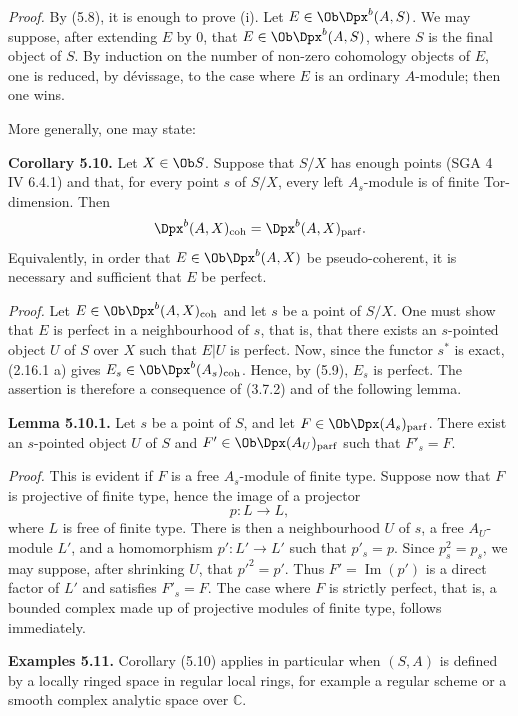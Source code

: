 \emph{Proof.} By (5.8), it is enough to prove (i). Let \(E\in\Ob\Dpx^b(A,S)\). We may suppose, after extending \(E\) by \(0\), that \(E\in\Ob\Dpx^b(A,S)\), where \(S\) is the final object of \(S\). By induction on the number of non-zero cohomology objects of \(E\), one is reduced, by dévissage, to the case where \(E\) is an ordinary \(A\)-module; then one wins.

More generally, one may state:

\textbf{Corollary 5.10.} Let \(X\in\Ob S\). Suppose that \(S/X\) has enough points (SGA 4 IV 6.4.1) and that, for every point \(s\) of \(S/X\), every left \(A_s\)-module is of finite Tor-dimension. Then
\[
  \Dpx^b(A,X)_{\mathrm{coh}}=\Dpx^b(A,X)_{\mathrm{parf}}.
\]
Equivalently, in order that \(E\in\Ob\Dpx^b(A,X)\) be pseudo-coherent, it is necessary and sufficient that \(E\) be perfect.

\emph{Proof.} Let \(E\in\Ob\Dpx^b(A,X)_{\mathrm{coh}}\) and let \(s\) be a point of \(S/X\). One must show that \(E\) is perfect in a neighbourhood of \(s\), that is, that there exists an \(s\)-pointed object \(U\) of \(S\) over \(X\) such that \(E|U\) is perfect. Now, since the functor \(s^*\) is exact, (2.16.1 a) gives \(E_s\in\Ob\Dpx^b(A_s)_{\mathrm{coh}}\). Hence, by (5.9), \(E_s\) is perfect. The assertion is therefore a consequence of (3.7.2) and of the following lemma.

\textbf{Lemma 5.10.1.} Let \(s\) be a point of \(S\), and let \(F\in\Ob\Dpx(A_s)_{\mathrm{parf}}\). There exist an \(s\)-pointed object \(U\) of \(S\) and \(F'\in\Ob\Dpx(A_U)_{\mathrm{parf}}\) such that \(F'_s=F\).

\emph{Proof.} This is evident if \(F\) is a free \(A_s\)-module of finite type. Suppose now that \(F\) is projective of finite type, hence the image of a projector
\[
  p:L\longrightarrow L,
\]
where \(L\) is free of finite type. There is then a neighbourhood \(U\) of \(s\), a free \(A_U\)-module \(L'\), and a homomorphism \(p':L'\to L'\) such that \(p'_s=p\). Since \(p_s^2=p_s\), we may suppose, after shrinking \(U\), that \(p'^2=p'\). Thus \(F'=\operatorname{Im}(p')\) is a direct factor of \(L'\) and satisfies \(F'_s=F\). The case where \(F\) is strictly perfect, that is, a bounded complex made up of projective modules of finite type, follows immediately.

\textbf{Examples 5.11.} Corollary (5.10) applies in particular when \((S,A)\) is defined by a locally ringed space in regular local rings, for example a regular scheme or a smooth complex analytic space over \(\mathbb C\).

